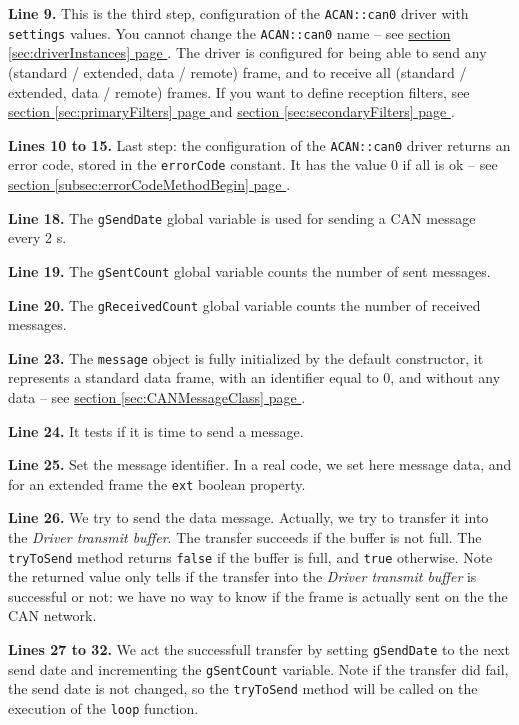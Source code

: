 \documentclass[9pt, a4paper, obeyspaces, openany]{extarticle}
\newcommand\refSectionPage[1]{\hyperref[sec:#1]{section \ref*{sec:#1} page \pageref{sec:#1}}}
\newcommand\refSubsectionPage[1]{\hyperref[subsec:#1]{section \ref*{subsec:#1} page \pageref{subsec:#1}}}
\begin{document}
{\bf Line 9.} This is the third step, configuration of the \texttt{ACAN::can0} driver with \texttt{settings} values. You cannot change the \texttt{ACAN::can0} name -- see \refSectionPage{driverInstances}. The driver is configured for being able to send any (standard / extended, data / remote) frame, and to receive all (standard / extended, data / remote) frames. If you want to define reception filters, see \refSectionPage{primaryFilters} and  \refSectionPage{secondaryFilters}.

{\bf Lines 10 to 15.} Last step: the configuration of the \texttt{ACAN::can0} driver returns an error code, stored in the \texttt{errorCode} constant. It has the value $0$ if all is ok -- see \refSubsectionPage{errorCodeMethodBegin}.

{\bf Line 18.} The \texttt{gSendDate} global variable is used for sending a CAN message every 2 s.

{\bf Line 19.} The \texttt{gSentCount} global variable counts the number of sent messages.

{\bf Line 20.} The \texttt{gReceivedCount} global variable counts the number of received messages.


{\bf Line 23.} The \texttt{message} object is fully initialized by the default constructor, it represents a standard data frame, with an identifier equal to $0$, and without any data -- see \refSectionPage{CANMessageClass}. 

{\bf Line 24.} It tests if it is time to send a message.

{\bf Line 25.} Set the message identifier. In a real code, we set here message data, and for an extended frame the \texttt{ext} boolean property.

{\bf Line 26.} We try to send the data message. Actually, we try to transfer it into the \emph{Driver transmit buffer}. The transfer succeeds if the buffer is not full. The \texttt{tryToSend} method returns \texttt{false} if the buffer is full, and \texttt{true} otherwise. Note the returned value only tells if the transfer into the \emph{Driver transmit buffer} is successful or not: we have no way to know if the frame is actually sent on the the CAN network.

{\bf Lines 27 to 32.} We act the successfull transfer by setting \texttt{gSendDate} to the next send date and incrementing the \texttt{gSentCount} variable. Note if the transfer did fail, the send date is not changed, so the \texttt{tryToSend} method will be called on the execution of the \texttt{loop} function.
\end{document}
